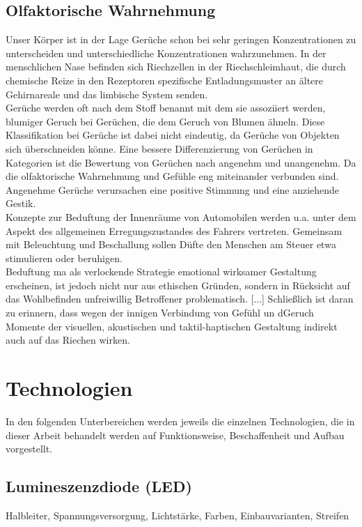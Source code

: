\subsection{Olfaktorische Wahrnehmung}
Unser Körper ist in der Lage Gerüche schon bei sehr geringen Konzentrationen zu unterscheiden und unterschiedliche Konzentrationen wahrzunehmen. In der menschlichen Nase befinden sich Riechzellen in der Riechschleimhaut, die durch chemische Reize in den Rezeptoren spezifische Entladungsmuster an ältere Gehirnareale und das limbische System senden. \cite[Vgl. Seite 102]{Schonhammer.2013}\\
Gerüche werden oft nach dem Stoff benannt mit dem sie assoziiert werden, \zB blumiger Geruch bei Gerüchen, die dem Geruch von Blumen ähneln. Diese Klassifikation bei Gerüche ist dabei nicht eindeutig, da Gerüche von Objekten sich überschneiden könne. Eine bessere Differenzierung von Gerüchen in Kategorien ist die Bewertung von Gerüchen nach angenehm und unangenehm. Da die olfaktorische Wahrnehmung und Gefühle eng miteinander verbunden sind. Angenehme Gerüche verursachen eine positive Stimmung und eine anziehende Gestik. \cite[Vgl. Seite 105f]{Schonhammer.2013}\\
\glqq Konzepte zur Beduftung der Innenräume von Automobilen werden u.a. unter dem Aspekt des allgemeinen Erregungszustandes des Fahrers vertreten. Gemeinsam mit Beleuchtung und Beschallung sollen Düfte den Menschen am Steuer etwa stimulieren oder beruhigen\grqq. \cite[Seite 122f]{Schonhammer.2013}\\
\glqq Beduftung ma als verlockende Strategie emotional wirksamer Gestaltung erscheinen, ist jedoch nicht nur aus ethischen Gründen, sondern in Rücksicht auf das Wohlbefinden unfreiwillig Betroffener problematisch. [...] Schließlich ist daran zu erinnern, dass wegen der innigen Verbindung von Gefühl un dGeruch Momente der visuellen, akustischen und taktil-haptischen Gestaltung indirekt auch auf das Riechen wirken. \grqq\cite[Seite 123]{Schonhammer.2013}
\section{Technologien}
In den folgenden Unterbereichen werden jeweils die einzelnen Technologien, die in dieser Arbeit behandelt werden auf Funktionsweise, Beschaffenheit und Aufbau vorgestellt.
\subsection{Lumineszenzdiode (LED)}
Halbleiter, Spannungsversorgung, Lichtstärke, Farben, Einbauvarianten, Streifen
\cite{G}
